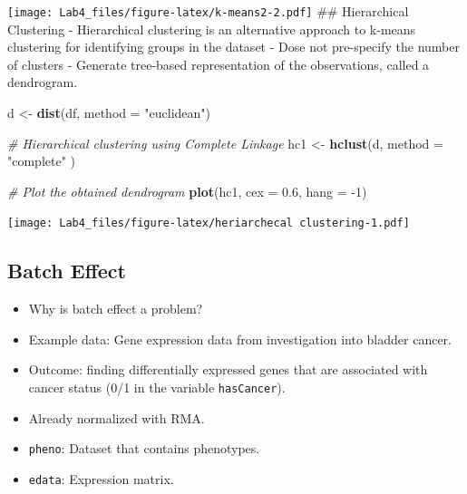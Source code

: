 \documentclass[
]{article}
\newenvironment{Shaded}{\begin{snugshade}}{\end{snugshade}}
\newcommand{\CommentTok}[1]{\textcolor[rgb]{0.56,0.35,0.01}{\textit{#1}}}
\newcommand{\DataTypeTok}[1]{\textcolor[rgb]{0.13,0.29,0.53}{#1}}
\newcommand{\DecValTok}[1]{\textcolor[rgb]{0.00,0.00,0.81}{#1}}
\newcommand{\FloatTok}[1]{\textcolor[rgb]{0.00,0.00,0.81}{#1}}
\newcommand{\KeywordTok}[1]{\textcolor[rgb]{0.13,0.29,0.53}{\textbf{#1}}}
\newcommand{\NormalTok}[1]{#1}
\newcommand{\OperatorTok}[1]{\textcolor[rgb]{0.81,0.36,0.00}{\textbf{#1}}}
\newcommand{\StringTok}[1]{\textcolor[rgb]{0.31,0.60,0.02}{#1}}
\providecommand{\tightlist}{%
  \setlength{\itemsep}{0pt}\setlength{\parskip}{0pt}}
\begin{document}
\texttt{[image: Lab4\_files/figure-latex/k-means2-2.pdf]} \#\#
Hierarchical Clustering - Hierarchical clustering is an alternative
approach to k-means clustering for identifying groups in the dataset -
Dose not pre-specify the number of clusters - Generate tree-based
representation of the observations, called a dendrogram.

\begin{Shaded}
\begin{Highlighting}[]
\NormalTok{d <-}\StringTok{ }\KeywordTok{dist}\NormalTok{(df, }\DataTypeTok{method =} \StringTok{"euclidean"}\NormalTok{)}

\CommentTok{# Hierarchical clustering using Complete Linkage}
\NormalTok{hc1 <-}\StringTok{ }\KeywordTok{hclust}\NormalTok{(d, }\DataTypeTok{method =} \StringTok{"complete"}\NormalTok{ )}

\CommentTok{# Plot the obtained dendrogram}
\KeywordTok{plot}\NormalTok{(hc1, }\DataTypeTok{cex =} \FloatTok{0.6}\NormalTok{, }\DataTypeTok{hang =} \DecValTok{-1}\NormalTok{)}
\end{Highlighting}
\end{Shaded}

\texttt{[image: Lab4\_files/figure-latex/heriarchecal clustering-1.pdf]}

\hypertarget{batch-effect}{%
\subsection{Batch Effect}\label{batch-effect}}

\begin{itemize}
\tightlist
\item
  Why is batch effect a problem?
\item
  Example data: Gene expression data from investigation into bladder
  cancer.
\item
  Outcome: finding differentially expressed genes that are associated
  with cancer status (0/1 in the variable \texttt{hasCancer}).
\item
  Already normalized with RMA.
\item
  \texttt{pheno}: Dataset that contains phenotypes.
\item
  \texttt{edata}: Expression matrix.
\end{itemize}

\begin{Shaded}
\end{Shaded}
\end{document}
